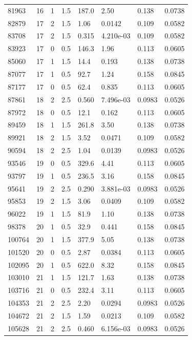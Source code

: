 \documentclass[preview]{standalone}
\begin{document}
{{{\begin{tabular}{L{1.2cm}C{1.2cm} C{0.3cm}C{0.5cm} C{1.4cm}C{1.4cm} C{1.4cm}C{1.4cm}}
  81963  &    16  & 1     & 1.5 &  187.0  & 2.50  & 0.138 &  0.0738   \\ 
  82879  &    17  & 2     & 1.5 &  1.06  & 0.0142  & 0.109 &  0.0582   \\ 
  83708  &    17  & 2     & 1.5 &  0.315  & 4.210e-03  & 0.109 &  0.0582   \\ 
  83923  &    17  & 0     & 0.5 &  146.3  & 1.96  & 0.113 &  0.0605   \\ 
  85060  &    17  & 1     & 1.5 &  14.4  & 0.193  & 0.138 &  0.0738   \\ 
  87077  &    17  & 1     & 0.5 &  92.7  & 1.24  & 0.158 &  0.0845   \\ 
  87177  &    17  & 0     & 0.5 &  62.4  & 0.835  & 0.113 &  0.0605   \\ 
  87861  &    18  & 2     & 2.5 &  0.560  & 7.496e-03  & 0.0983 &  0.0526   \\ 
  87972  &    18  & 0     & 0.5 &  12.1  & 0.162  & 0.113 &  0.0605   \\ 
  89459  &    18  & 1     & 1.5 &  261.8  & 3.50  & 0.138 &  0.0738   \\ 
  89921  &    18  & 2     & 1.5 &  3.52  & 0.0471  & 0.109 &  0.0582   \\ 
  90594  &    18  & 2     & 2.5 &  1.04  & 0.0139  & 0.0983 &  0.0526   \\ 
  93546  &    19  & 0     & 0.5 &  329.6  & 4.41  & 0.113 &  0.0605   \\ 
  93797  &    19  & 1     & 0.5 &  236.5  & 3.16  & 0.158 &  0.0845   \\ 
  95641  &    19  & 2     & 2.5 &  0.290  & 3.881e-03  & 0.0983 &  0.0526   \\ 
  95853  &    19  & 2     & 1.5 &  3.06  & 0.0409  & 0.109 &  0.0582   \\ 
  96022  &    19  & 1     & 1.5 &  81.9  & 1.10  & 0.138 &  0.0738   \\ 
  98378  &    20  & 1     & 0.5 &  32.9  & 0.441  & 0.158 &  0.0845   \\ 
  100764  &    20  & 1     & 1.5 &  377.9  & 5.05  & 0.138 &  0.0738   \\ 
  101520  &    20  & 0     & 0.5 &  2.87  & 0.0384  & 0.113 &  0.0605   \\ 
  102095  &    20  & 1     & 0.5 &  622.0  & 8.32  & 0.158 &  0.0845   \\ 
  103010  &    21  & 1     & 1.5 &  121.7  & 1.63  & 0.138 &  0.0738   \\ 
  103716  &    21  & 0     & 0.5 &  232.4  & 3.11  & 0.113 &  0.0605   \\ 
  104353  &    21  & 2     & 2.5 &  2.20  & 0.0294  & 0.0983 &  0.0526   \\ 
  104672  &    21  & 2     & 1.5 &  1.59  & 0.0213  & 0.109 &  0.0582   \\ 
  105628  &    21  & 2     & 2.5 &  0.460  & 6.156e-03  & 0.0983 &  0.0526   \\ 
\hline 
\end{tabular} 

}}}
\end{document}
